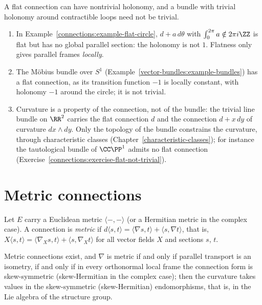 \begin{counterexample}\label{connections:counterexample-flat-holonomy}
A flat connection can have nontrivial holonomy, and a bundle with trivial holonomy around contractible loops need not be trivial.
\begin{enumerate}
\item In Example~\ref{connections:example-flat-circle}, $d + a\,d\theta$ with $\int_0^{2\pi}a \notin 2\pi i\ZZ$ is flat but has no global parallel section: the holonomy is not $1$. Flatness
only gives parallel frames \emph{locally}.
\item The M\"obius bundle over $S^1$ (Example~\ref{vector-bundles:example-bundles}) has a flat connection, as its transition function $-1$ is locally constant, with holonomy $-1$
around the circle; it is not trivial.
\item Curvature is a property of the connection, not of the bundle: the trivial line bundle on $\RR^2$ carries the flat connection $d$ and the connection $d + x\,dy$ of
curvature $dx \wedge dy$. Only the topology of the bundle constrains the curvature, through characteristic classes (Chapter~\ref{characteristic-classes}); for instance the
tautological bundle of $\CC\PP^1$ admits no flat connection (Exercise~\ref{connections:exercise-flat-not-trivial}).
\end{enumerate}
\end{counterexample}

\section{Metric connections}\label{connections:section-metric}

\begin{definition}\label{connections:definition-metric-connection}
Let $E$ carry a Euclidean metric $\langle -, - \rangle$ (or a Hermitian metric in the complex case). A connection is \emph{metric} if
$d\langle s, t \rangle = \langle \nabla s, t \rangle + \langle s, \nabla t \rangle$, that is, $X\langle s, t\rangle = \langle\nabla_Xs, t\rangle + \langle s, \nabla_Xt\rangle$ for all
vector fields $X$ and sections $s$, $t$.
\end{definition}

\begin{proposition}\label{connections:proposition-metric-connections}
Metric connections exist, and $\nabla$ is metric if and only if parallel transport is an isometry, if and only if in every orthonormal local frame the connection form is skew-symmetric (skew-Hermitian in
the complex case); then the curvature takes values in the skew-symmetric (skew-Hermitian) endomorphisms, that is, in the Lie algebra of the structure group.
\end{proposition}

